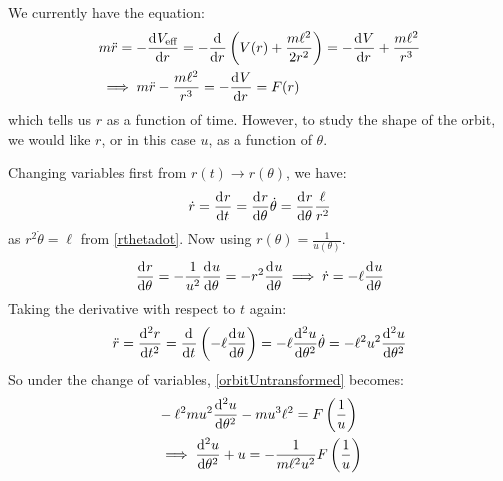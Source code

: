 \documentclass[../main.tex]{subfiles}
\begin{document}
We currently have the equation:
\begin{align}
  &m\ddot{r} = -\deriv{V_{\text{eff}}}{r} = - \deriv{}{r}\left(V(r) + \frac{m\ell^2}{2r^2}\right) = - \deriv{V}{r} + \frac{m\ell^2}{r^3} \nonumber \\
  &\implies m\ddot{r} - \frac{m\ell^2}{r^3} = - \deriv{V}{r} = F(r) \label{orbitUntransformed}
\end{align}
which tells us $r$ as a function of time.
However, to study the shape of the orbit, we would like $r$, or in this case $u$, as a function of $\theta$.

Changing variables first from $r(t) \to r(\theta)$, we have:
\[
  \dot{r} = \deriv{r}{t} = \deriv{r}{\theta}\dot{\theta} = \deriv{r}{\theta} \frac{\ell}{r^2}  \\
\]
as $r^2 \dot{\theta} = \ell$ from \cref{rthetadot}.
Now using $r(\theta) = \frac{1}{u(\theta)}$.
\[
  \deriv{r}{\theta} = - \frac{1}{u^2} \deriv{u}{\theta} = -r^2 \deriv{u}{\theta} \implies \dot{r} = -\ell \deriv{u}{\theta}
\]
Taking the derivative with respect to $t$ again:
\[
  \ddot{r} = \deriv[2]{r}{t} = \deriv{}{t}\left(-\ell \deriv{u}{\theta}\right) = -\ell \deriv[2]{u}{\theta} \dot{\theta} = - \ell^2 u^2 \deriv[2]{u}{\theta}
\]
So under the change of variables, \cref{orbitUntransformed} becomes:
\begin{align*}
  &-\ell^2 m u^2 \deriv[2]{u}{\theta} - mu^3\ell^2 = F\left(\frac{1}{u}\right) \\
  &\implies \deriv[2]{u}{\theta} + u = - \frac{1}{m\ell^2 u^2}F\left(\frac{1}{u}\right)
\end{align*}
\end{document}
